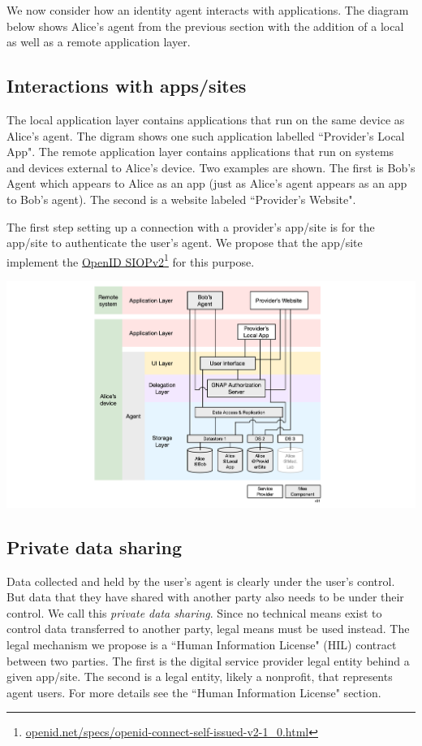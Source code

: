 \documentclass[11pt, oneside]{article}   	%
\newcommand{\hyperfootnote}[1][]{\def\ArgI{{#1}}\hyperfootnoteRelay}
\newcommand\hyperfootnoteRelay[2][]{\href{#1#2}{\ArgI}\footnote{\href{#1#2}{#2}}}
\begin{document}
We now consider how an identity agent interacts with applications. The diagram below shows Alice's agent from the previous section with the addition of a local as well as a remote application layer. 

\subsection{Interactions with apps/sites}

The local application layer contains applications that run on the same device as Alice's agent. The digram shows one such application labelled ``Provider's Local App". The remote application layer contains applications that run on systems and devices external to Alice's device. Two examples are shown. The first is Bob's Agent which appears to Alice as an app (just as Alice's agent appears as an app to Bob's agent). The second is a website labeled ``Provider's Website". 

The first step setting up a connection with a provider's app/site is for the app/site to authenticate the user's agent. We propose that the app/site implement the \hyperfootnote[OpenID SIOPv2][https://]{openid.net/specs/openid-connect-self-issued-v2-1\_0.html} for this purpose.

\includegraphics[width=\textwidth]{./images/applications.png}

\subsection{Private data sharing}
Data collected and held by the user's agent is clearly under the user's control. But data that they have shared with another party also needs to be under their control. We call this \emph{private data sharing}. Since no technical means exist to control data transferred to another party, legal means must be used instead. The legal mechanism we propose is a ``Human Information License" (HIL) contract between two parties. The first is the digital service provider legal entity behind a given app/site. The second is a legal entity, likely a nonprofit, that represents agent users. For more details see the ``Human Information License" section.
\end{document}
